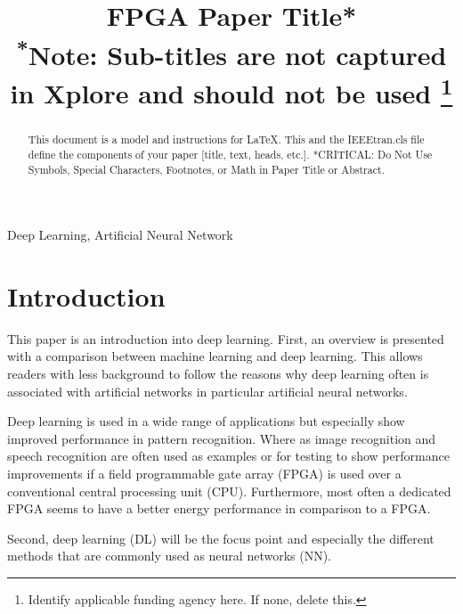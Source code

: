 \documentclass[conference]{IEEEtran}
\begin{document}
\title{FPGA Paper Title*\\
{\footnotesize \textsuperscript{*}Note: Sub-titles are not captured in Xplore and
should not be used}
\thanks{Identify applicable funding agency here. If none, delete this.}
}

\author{
}

\maketitle

\begin{abstract}
This document is a model and instructions for \LaTeX.
This and the IEEEtran.cls file define the components of your paper [title, text, heads, etc.]. *CRITICAL: Do Not Use Symbols, Special Characters, Footnotes, 
or Math in Paper Title or Abstract.
\end{abstract}

\begin{IEEEkeywords}
Deep Learning, Artificial Neural Network
\end{IEEEkeywords}

\section{Introduction}
This paper is an introduction into deep learning. 
First, an overview is presented with a comparison between machine learning and deep learning. 
This allows readers with less background to follow the reasons why deep learning often is associated with artificial networks in particular artificial neural networks. 


Deep learning is used in a wide range of applications but especially show improved performance in pattern recognition. Where as image recognition and speech recognition are often used as examples or for testing to show performance improvements if a field programmable gate array (FPGA) is used over a conventional central processing unit (CPU). Furthermore, most often a dedicated FPGA seems to have a better energy performance in comparison to a FPGA. 

Second, deep learning (DL) will be the focus point and especially the different methods that are commonly used as neural networks (NN). 
\end{document}
